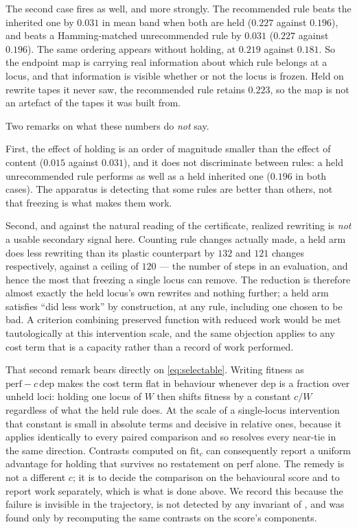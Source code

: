 The second case fires as well, and more strongly. The recommended rule beats the
inherited one by $0.031$ in mean band when both are held ($0.227$ against $0.196$),
and beats a Hamming-matched unrecommended rule by $0.031$ ($0.227$ against $0.196$).
The same ordering appears without holding, at $0.219$ against $0.181$. So the
endpoint map is carrying real information about which rule belongs at a locus, and
that information is visible whether or not the locus is frozen. Held on rewrite
tapes it never saw, the recommended rule retains $0.223$, so the map is not an
artefact of the tapes it was built from.

Two remarks on what these numbers do \emph{not} say.

First, the effect of holding is an order of magnitude smaller than the effect of
content ($0.015$ against $0.031$), and it does not discriminate between rules: a
held unrecommended rule performs as well as a held inherited one ($0.196$ in both
cases). The apparatus is detecting that some rules are better than others, not that
freezing is what makes them work.

Second, and against the natural reading of the certificate, realized rewriting is
\emph{not} a usable secondary signal here. Counting rule changes actually made, a
held arm does less rewriting than its plastic counterpart by $132$ and $121$ changes
respectively, against a ceiling of $120$ --- the number of steps in an evaluation,
and hence the most that freezing a single locus can remove. The reduction is
therefore almost exactly the held locus's own rewrites and nothing further; a held
arm satisfies ``did less work'' by construction, at any rule, including one chosen
to be bad. A criterion combining preserved function with reduced work would be met
tautologically at this intervention scale, and the same objection applies to any
cost term that is a capacity rather than a record of work performed.

That second remark bears directly on \eqref{eq:selectable}. Writing fitness as
$\mathrm{perf} - c\,\mathrm{dep}$ makes the cost term flat in behaviour whenever
$\mathrm{dep}$ is a fraction over unheld loci: holding one locus of $W$ then shifts
fitness by a constant $c/W$ regardless of what the held rule does. At the scale of a
single-locus intervention that constant is small in absolute terms and decisive in
relative ones, because it applies identically to every paired comparison and so
resolves every near-tie in the same direction. Contrasts computed on
$\mathrm{fit}_c$ can consequently report a uniform advantage for holding that
survives no restatement on $\mathrm{perf}$ alone. The remedy is not a different $c$;
it is to decide the comparison on the behavioural score and to report work
separately, which is what is done above. We record this because the failure is
invisible in the trajectory, is not detected by any invariant of
, and was found only by recomputing the same contrasts on the
score's components.


